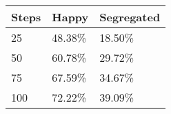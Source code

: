\begin{table}[ht]
\centering
\begin{tabular}{lll}
  \hline
Steps & Happy & Segregated \\ 
  \hline
25 & 48.38\% & 18.50\% \\ 
  50 & 60.78\% & 29.72\% \\ 
  75 & 67.59\% & 34.67\% \\ 
  100 & 72.22\% & 39.09\% \\ 
   \hline
\end{tabular}
\end{table}
